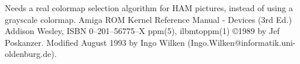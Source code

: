 Needs a real colormap selection algorithm for HAM pictures,
instead of using a grayscale colormap.
Amiga ROM Kernel Reference Manual - Devices (3rd Ed.)
Addison Wesley, ISBN 0--201--56775--X
ppm(5), ilbmtoppm(1)
\copyright 1989 by Jef Poskanzer.
\nwl
Modified August 1993 by Ingo Wilken
(Ingo.Wilken@informatik.uni-oldenburg.de).
%
 
%

\newpage
%

